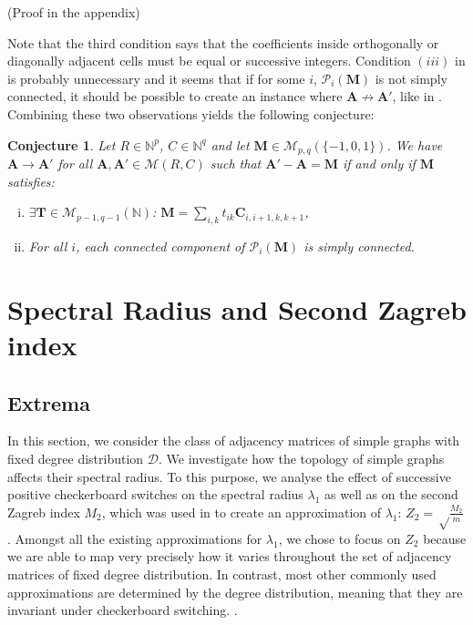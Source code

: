 \documentclass{article}
\newtheorem{conj}{Conjecture}
\newcommand{\N}{\mathbb{N}}
\newcommand{\D}{\mathcal D}
\newcommand{\MM}{\mathcal M}
\renewcommand{\P}{\mathcal P}
\renewcommand{\ll}{\lambda_1}
\newcommand{\rar}{\rightarrow}
\newcommand{\A}{\mathbf A}
\newcommand{\C}{\mathbf C}
\newcommand{\M}{\mathbf M}
\newcommand{\T}{\mathbf T}
\begin{document}
\noindent (Proof in the appendix)
\bigskip

Note that the third condition says that the coefficients inside orthogonally or diagonally adjacent cells must be equal or successive integers. Condition $(iii)$ in  is probably unnecessary and it seems that if for some $i$, $\P_i(\M)$ is not simply connected, it should be possible to create an instance where $\A\not\rar\A'$, like in . Combining these two observations yields the following conjecture:

\begin{conj}
Let $R\in \N^p$, $C\in \N^q$ and let $\M\in \MM_{p,q}(\{-1,0,1\})$. We have $\A\rar \A'$ for all $\A,\A'\in\MM(R,C)$ such that $\A'-\A=\M$ if and only if $\M$ satisfies:
\begin{enumerate}[(i)]
    \item $\exists \T\in \MM_{p-1,q-1}(\N)$: $\M=\sum_{i,k} t_{ik}\C_{i,i+1,k,k+1}$,
    \item For all $i$, each connected component of $\P_i(\M)$ is simply connected.
\end{enumerate}
\end{conj}


\section{Spectral Radius and Second Zagreb index}\label{sec:spectral radius}

\subsection{Extrema}

In this section, we consider the class of adjacency matrices of simple graphs with fixed degree distribution $\D$. We investigate how the topology of simple graphs affects their spectral radius. To this purpose, we analyse the effect of successive positive checkerboard switches on the spectral radius $\ll$ as well as on the second Zagreb index $M_2$, which was used in \cite{abdo2014estimating} to create an approximation of $\ll$: $Z_2=\sqrt\frac{M_2}m$.
Amongst all the existing approximations for $\ll$, we chose to focus on $Z_2$ because we are able to map very precisely how it varies throughout the set of adjacency matrices of fixed degree distribution. In contrast, most other commonly used approximations are determined by the degree distribution, meaning that they are invariant under checkerboard switching. \cite{pastor2018eigenvector,restrepo2007approximating}. 
\end{document}
